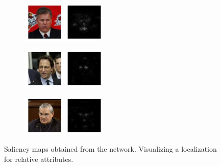 \begin{figure}
\begin{subfigure}
    \end{subfigure}
    \begin{subfigure}
        \centering
        \includegraphics[width=4cm]{saliency/smile-2.jpeg}
    \end{subfigure}
    \begin{subfigure}
        \centering
        \includegraphics[width=4cm]{saliency/eye-1.jpeg}
    \end{subfigure}
    \begin{subfigure}
        \centering
        \includegraphics[width=4cm]{saliency/eye-2.jpeg}
    \end{subfigure}
    \caption{Saliency maps obtained from the network. Visualizing a localization for relative attributes.}
    \label{fig.5}
\end{figure}

